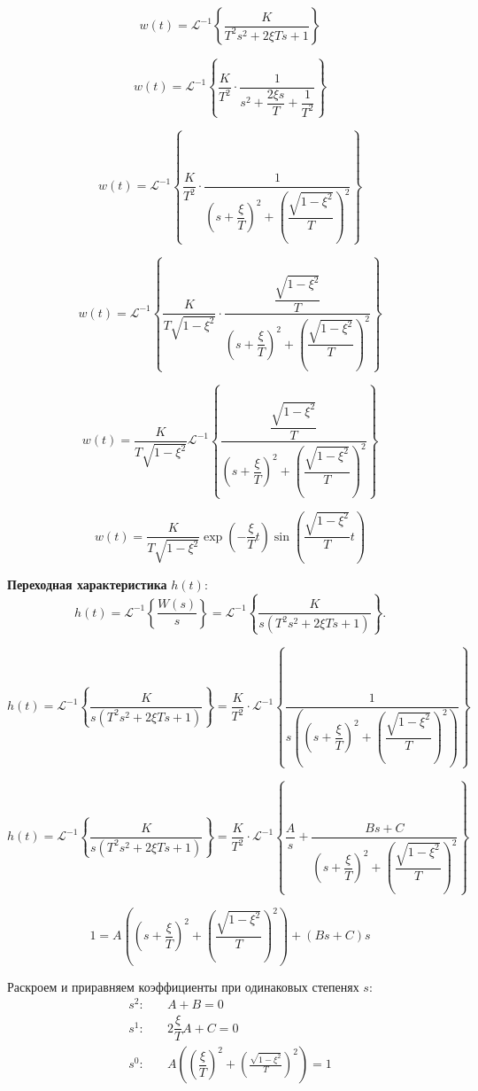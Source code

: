 \documentclass[a5paper, 10pt]{article}
\theoremstyle{definition}
\theoremstyle{plain}
\theoremstyle{remark}
\begin{document}
$$w(t)=\mathcal{L}^{-1}\left\{ \frac{K}{T^2 s^2 + 2 \xi T s + 1}\right\}$$

$$w(t)=\mathcal{L}^{-1}\left\{ \dfrac{K}{T^2}\cdot\frac{1}{s^2 + \dfrac{2 \xi s}{T} + \dfrac{1}{T^2}}\right\}$$

$$w(t)=\mathcal{L}^{-1}\left\{ \dfrac{K}{T^2}\cdot\frac{1}{\left(s + \dfrac{ \xi }{T}\right)^2 + \left(\dfrac{\sqrt{1-\xi^2}}{T}\right)^2}\right\}$$

$$w(t)=\mathcal{L}^{-1}\left\{ \dfrac{K}{T\sqrt{1-\xi^2}}\cdot\frac{\dfrac{\sqrt{1-\xi^2}}{T}}{\left(s + \dfrac{ \xi }{T}\right)^2 + \left(\dfrac{\sqrt{1-\xi^2}}{T}\right)^2}\right\}$$

$$w(t)=\dfrac{K}{T\sqrt{1-\xi^2}}\mathcal{L}^{-1}\left\{\frac{\dfrac{\sqrt{1-\xi^2}}{T}}{\left(s + \dfrac{ \xi }{T}\right)^2 + \left(\dfrac{\sqrt{1-\xi^2}}{T}\right)^2}\right\}$$

$$w(t)=\dfrac{K}{T\sqrt{1-\xi^2}}\exp\left(-\dfrac{\xi}{T}t\right)\sin\left(\dfrac{\sqrt{1-\xi^2}}{T}t\right)$$







\textbf{Переходная характеристика} $h(t)$:
\[
h(t) = \mathcal{L}^{-1}\!\left\{ \frac{W(s)}{s} \right\}
     = \mathcal{L}^{-1}\!\left\{ \frac{K}{s(T^2 s^2 + 2\xi T s + 1)} \right\}.
\]

\[
h(t)=\mathcal{L}^{-1}\!\left\{\frac{K}{s(T^2 s^2 + 2\xi T s + 1)}\right\}
     = \frac{K}{T^2} \cdot\mathcal{L}^{-1}\!\left\{ \frac{1}{s\left(\left(s + \dfrac{ \xi }{T}\right)^2 + \left(\dfrac{\sqrt{1-\xi^2}}{T}\right)^2\right)}\right\}
\]

\[
h(t)=\mathcal{L}^{-1}\!\left\{\frac{K}{s(T^2 s^2 + 2\xi T s + 1)}\right\}
     = \frac{K}{T^2} \cdot\mathcal{L}^{-1}\!\left\{ \dfrac{A}{s}+\frac{Bs+C}{\left(s + \dfrac{ \xi }{T}\right)^2 + \left(\dfrac{\sqrt{1-\xi^2}}{T}\right)^2}\right\}
\]

\[
1=A\left(\left(s + \dfrac{ \xi }{T}\right)^2 + \left(\dfrac{\sqrt{1-\xi^2}}{T}\right)^2\right)+\left(Bs+C\right)s
\]
\vspace{0.5cm}

Раскроем и приравняем коэффициенты при одинаковых степенях $s$:
\begin{align*}
s^2: &\quad A + B = 0 \\
s^1: &\quad 2\dfrac{\xi}{T} A + C = 0 \\
s^0: &\quad A\left(\left(\dfrac{\xi}{T}\right)^2 + \left(\frac{\sqrt{1-\xi^2}}{T}\right)^2\right) = 1
\end{align*}
\end{document}
